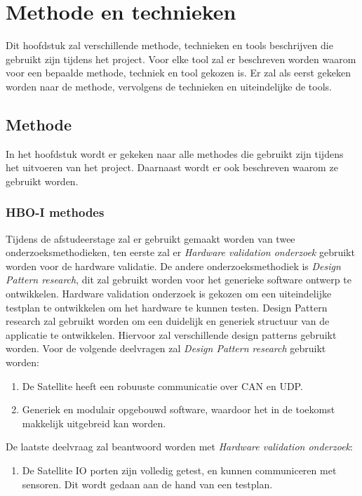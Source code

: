 \chapter{Methode en technieken}
Dit hoofdstuk zal verschillende methode, technieken en tools beschrijven die gebruikt zijn tijdens het project. Voor elke tool zal er beschreven worden waarom voor een bepaalde methode, techniek en tool gekozen is. Er zal als eerst gekeken worden naar de methode, vervolgens de technieken en uiteindelijke de tools.

\section{Methode}
In het hoofdstuk wordt er gekeken naar alle methodes die gebruikt zijn tijdens het uitvoeren van het project. Daarnaast wordt er ook beschreven waarom ze gebruikt worden.

\subsection{HBO-I methodes}
Tijdens de afstudeerstage zal er gebruikt gemaakt worden van twee onderzoeksmethodieken, ten eerste zal er \textit{Hardware validation onderzoek} gebruikt worden voor de hardware validatie. De andere onderzoeksmethodiek is \textit{Design Pattern research}, dit zal gebruikt worden voor het generieke software ontwerp te ontwikkelen\parencite{researchmethods}. Hardware validation onderzoek is gekozen om een uiteindelijke testplan te ontwikkelen om het hardware te kunnen testen. Design Pattern research zal gebruikt worden om een duidelijk en generiek structuur van de applicatie te ontwikkelen. Hiervoor zal verschillende design patterns gebruikt worden. Voor de volgende deelvragen zal \textit{Design Pattern research} gebruikt worden: 
\begin{enumerate}
	\item De Satellite heeft een robuuste communicatie over CAN en UDP.
	\item Generiek en modulair opgebouwd software, waardoor het in de toekomst makkelijk uitgebreid kan worden.
\end{enumerate}

\noindent De laatste deelvraag zal beantwoord worden met \textit{Hardware validation onderzoek}:
\begin{enumerate}
	\item De Satellite IO porten zijn volledig getest, en kunnen communiceren met sensoren. Dit wordt gedaan aan de hand van een testplan.
\end{enumerate}

